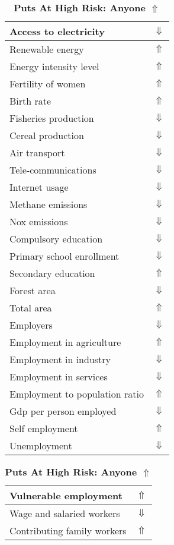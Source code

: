 \documentclass[12pt,notitlepage,oneside]{report}
\begin{document}
\begin{table}[!htb]
\caption{\textbf{Puts At High Risk: Anyone $\Uparrow$}}
\centering
\label{Correlated Socio-economic Factors0}
\begin{tabular}{|l|l|}
\hline
Access to electricity & $\Downarrow$\\ \hline
Renewable energy & $\Uparrow$\\ \hline
Energy intensity level & $\Uparrow$\\ \hline
Fertility of women & $\Uparrow$\\ \hline
Birth rate & $\Uparrow$\\ \hline
Fisheries production & $\Downarrow$\\ \hline
Cereal production & $\Downarrow$\\ \hline
Air transport  & $\Downarrow$\\ \hline
Tele-communications & $\Downarrow$\\ \hline
Internet usage & $\Downarrow$\\ \hline
Methane emissions & $\Downarrow$\\ \hline
Nox emissions & $\Downarrow$\\ \hline
Compulsory education & $\Downarrow$\\ \hline
Primary school enrollment & $\Downarrow$\\ \hline
Secondary education & $\Uparrow$\\ \hline
Forest area & $\Downarrow$\\ \hline
Total area & $\Uparrow$\\ \hline
Employers & $\Downarrow$\\ \hline
Employment in agriculture & $\Uparrow$\\ \hline
Employment in industry & $\Downarrow$\\ \hline
Employment in services & $\Downarrow$\\ \hline
Employment to population ratio & $\Uparrow$\\ \hline
Gdp per person employed & $\Downarrow$\\ \hline
Self employment & $\Uparrow$\\ \hline
Unemployment & $\Downarrow$\\ \hline
\end{tabular}
\begin{tabular}{|l|l|}
\hline
Vulnerable employment & $\Uparrow$\\ \hline
Wage and salaried workers & $\Downarrow$\\ \hline
Contributing family workers & $\Uparrow$\\ \hline

\end{tabular}
\end{table}
\end{document}
